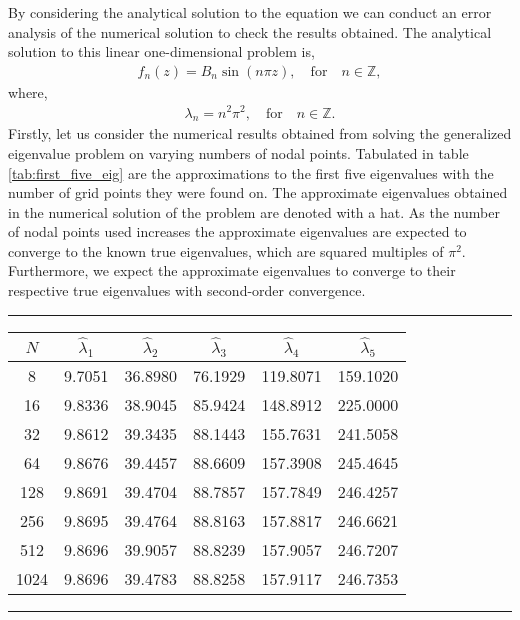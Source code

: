 \documentclass[a4paper, 12pt, twoside, openright]{article}
\numberwithin{equation}{section}
\begin{document}
By considering the analytical solution to the equation we can conduct an error analysis of the numerical solution to check the results obtained. The analytical solution to this linear one-dimensional problem is,
\begin{align}
f_n(z) = B_n \sin(n\pi z), \quad \text{for} \quad n \in \mathbb{Z},
\end{align}
where, 
\begin{align}
\lambda_n = n^2\pi^2, \quad \text{for} \quad n \in \mathbb{Z}.
\end{align}
Firstly, let us consider the numerical results obtained from solving the generalized eigenvalue problem on varying numbers of nodal points. Tabulated in table \ref{tab:first_five_eig} are the approximations to the first five eigenvalues with the number of grid points they were found on. The approximate eigenvalues obtained in the numerical solution of the problem are denoted with a hat. As the number of nodal points used increases the approximate eigenvalues are expected to converge to the known true eigenvalues, which are squared multiples of $\pi^2$. Furthermore, we expect the approximate eigenvalues to converge to their respective true eigenvalues with second-order convergence. 
\begin{table}[H]
\rule{\linewidth}{1.5pt}
\centering
\bgroup
\def\arraystretch{1.25}
\begin{tabular}{ c@{\qquad} c@{\qquad} c@{\qquad} c@{\qquad} c@{\qquad} c@{\qquad} }
$N$ & $\hat \lambda_1$ & $\hat \lambda_2$ & $\hat \lambda_3$ & $\hat \lambda_4$ & $\hat \lambda_5$ \\\hline
8 & 9.7051 & 36.8980 & 76.1929 & 119.8071 & 159.1020 \\
16 & 9.8336 & 38.9045 & 85.9424 & 148.8912 & 225.0000 \\
32 & 9.8612 & 39.3435 & 88.1443 & 155.7631 & 241.5058 \\
64 & 9.8676 & 39.4457 & 88.6609 & 157.3908 & 245.4645 \\
128 & 9.8691 & 39.4704 & 88.7857 & 157.7849 & 246.4257 \\
256 & 9.8695 & 39.4764 & 88.8163 & 157.8817 & 246.6621 \\
512 & 9.8696 & 39.9057 & 88.8239 & 157.9057& 246.7207 \\
1024 & 9.8696 & 39.4783 & 88.8258 & 157.9117 & 246.7353 
\end{tabular}
\egroup
{}
\rule{\linewidth}{1.5pt}
\end{table}
\end{document}
